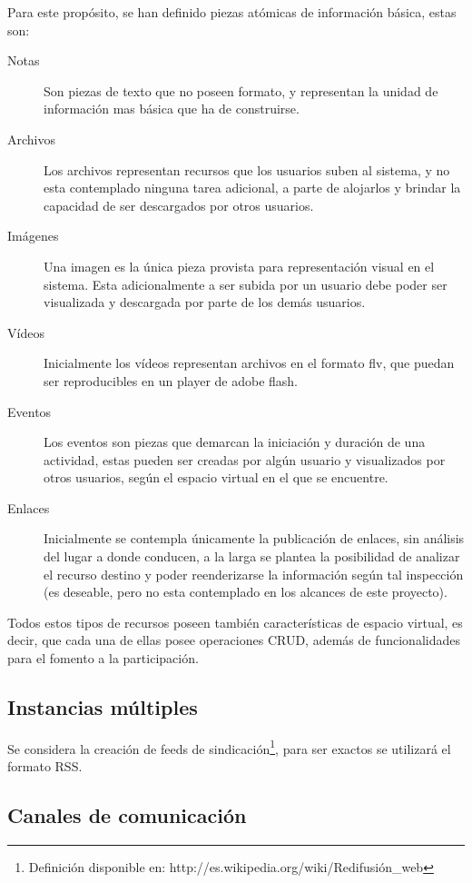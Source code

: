 Para este propósito, se han definido piezas atómicas de información básica,
estas son:

\begin{description}
\item [Notas] Son piezas de texto que no poseen formato, y representan la unidad
de información mas básica que ha de construirse.
\item [Archivos] Los archivos representan recursos que los usuarios suben al
sistema, y no esta contemplado ninguna tarea adicional, a parte de alojarlos y
brindar la capacidad de ser descargados por otros usuarios.
\item [Imágenes] Una imagen es la única pieza provista para representación
visual en el sistema. Esta adicionalmente a ser subida por un usuario debe
poder ser visualizada y descargada por parte de los demás usuarios.
\item [Vídeos] Inicialmente los vídeos representan archivos en el formato flv,
que puedan ser reproducibles en un player de adobe flash.
\item [Eventos] Los eventos son piezas que demarcan la iniciación y duración de
una actividad, estas pueden ser creadas por algún usuario y visualizados por
otros usuarios, según el espacio virtual en el que se encuentre.
\item [Enlaces] Inicialmente se contempla únicamente la publicación de enlaces,
sin análisis del lugar a donde conducen, a la larga se plantea la posibilidad de
analizar el recurso destino y poder reenderizarse la información según tal
inspección (es deseable, pero no esta contemplado en los alcances de este
proyecto).
\end{description}

Todos estos tipos de recursos poseen también características de espacio virtual,
es decir, que cada una de ellas posee operaciones CRUD, además de
funcionalidades para el fomento a la participación.

\subsection{Instancias múltiples}

Se considera la creación de feeds de
sindicación\footnote{Definición disponible en:
http://es.wikipedia.org/wiki/Redifusión\_web}, para ser exactos se utilizará
el formato RSS.

\subsection{Canales de comunicación}

